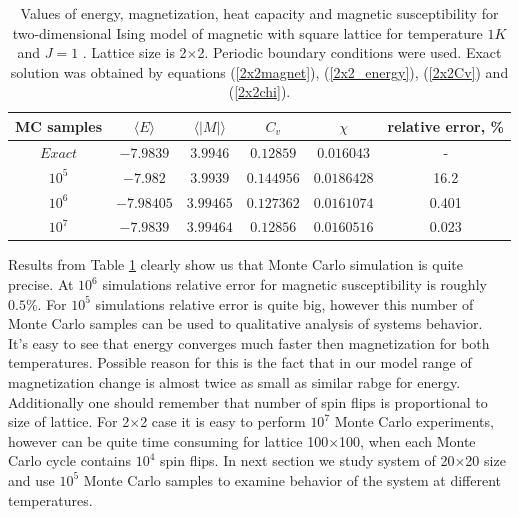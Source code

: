 \documentclass[10pt]{article}
\begin{document}
\begin{table}[h!]
  \caption{Values of energy, magnetization, heat capacity and magnetic susceptibility for two-dimensional Ising model of magnetic with square lattice for temperature $1K$ and $J=1$ . Lattice size is 2$\times$2. Periodic boundary conditions were used. Exact solution was obtained by equations (\ref{2x2magnet}), (\ref{2x2_energy}), (\ref{2x2Cv}) and (\ref{2x2chi}). }
  \label{tab:2x2_compare}
  \begin{center}
    \begin{tabular}{c|c|c|c|c|c}
    \hline
		MC samples & $\langle E\rangle$ & $\langle \left\vert M\right\vert \rangle$ & $C_{v}$ & $\chi$ & relative error, \% \\
        \hline
	$	Exact $ & $-7.9839$ & $ 3.9946 $ & $ 0.12859 $ & $ 0.016043 $ & - \\
	$	10^5 $  & $-7.982$ & $ 3.9939 $ & $ 0.144956 $ & $ 0.0186428 $ & 16.2 \\
	$	10^6 $  & $-7.98405$ & $ 3.99465 $ & $ 0.127362 $ & $ 0.0161074 $ & 0.401 \\
	$	10^7 $  & $-7.9839$ & $ 3.99464 $ & $ 0.12856 $ & $ 0.0160516 $ & 0.023 \\

	\end{tabular}
  \end{center}
\end{table}

Results from Table \ref{tab:2x2_compare} clearly show us that Monte Carlo simulation is quite precise. At $10^6$ simulations relative error for magnetic susceptibility is roughly $0.5 \%$. For $10^5$ simulations relative error is quite big, however this number of Monte Carlo samples can be used to qualitative analysis of systems behavior.\\
It's easy to see that energy converges much faster then magnetization for both temperatures. Possible reason for this is the fact that in our model range of magnetization change is almost twice as small as similar rabge for energy. 
Additionally one should remember that number of spin flips is proportional to size of lattice. For 2$\times$2 case it is easy to perform $10^7$ Monte Carlo experiments, however can be quite time consuming for lattice 100$\times$100, when each Monte Carlo cycle contains $10^4$ spin flips. 
In next section we study system of 20$\times$20 size and use $10^5$ Monte Carlo samples to examine behavior of the system at different temperatures. 
\end{document}
